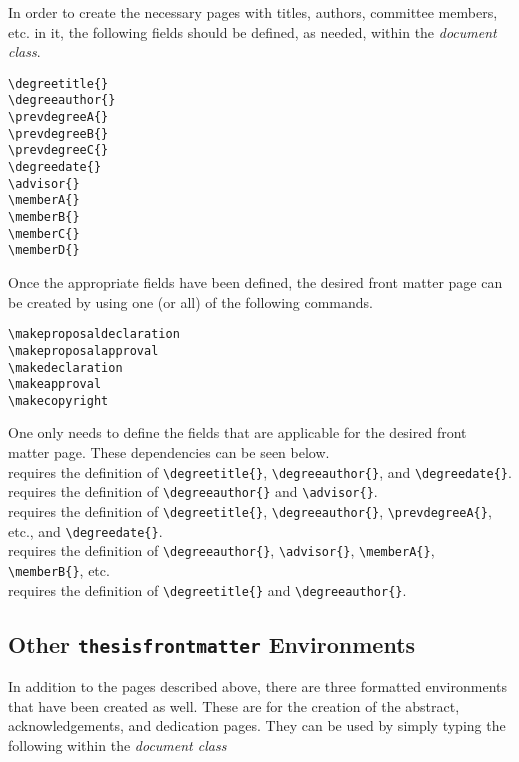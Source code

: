\documentclass[10pt, oneside]{article}
\begin{document}
In order to create the necessary pages with titles, authors, committee members, etc. in
it, the following fields should be defined, as needed, within the \textit{document
class}.

\begin{verbatim}
\degreetitle{}
\degreeauthor{}
\prevdegreeA{}
\prevdegreeB{}
\prevdegreeC{}
\degreedate{}
\advisor{}
\memberA{}
\memberB{}
\memberC{}
\memberD{}
\end{verbatim}

Once the appropriate fields have been defined, the desired front matter page can be
created by using one (or all) of the following commands.

\begin{verbatim}
\makeproposaldeclaration
\makeproposalapproval
\makedeclaration
\makeapproval
\makecopyright
\end{verbatim}

One only needs to define the fields that are applicable for the desired front matter
page. These dependencies can be seen below. \\

 requires the definition of
\verb"\degreetitle{}", \verb"\degreeauthor{}", and \verb"\degreedate{}". \\

 requires the definition
of \verb"\degreeauthor{}" and \verb"\advisor{}". \\

 requires the definition of
\verb"\degreetitle{}", \verb"\degreeauthor{}", \verb"\prevdegreeA{}",
etc., and \verb"\degreedate{}". \\

 requires the definition of
\verb"\degreeauthor{}", \verb"\advisor{}", \verb"\memberA{}",
\verb"\memberB{}", etc. \\

 requires the definition
of \verb"\degreetitle{}" and \verb"\degreeauthor{}". \\




\subsection{Other \texttt{thesisfrontmatter} Environments}
In addition to the pages described above, there are three formatted environments that
have been created as well.  These are for the creation of the abstract, acknowledgements,
and dedication pages.  They can be used by simply typing the following within the
 \textit{document class}\\
\end{document}
